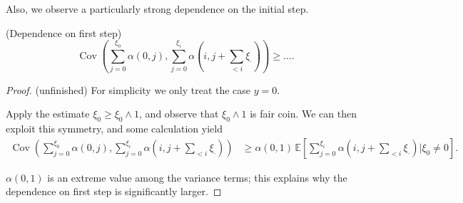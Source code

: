 Also, we observe a particularly strong dependence on the initial step.

\begin{lemma}(Dependence on first step)
	\[
		\operatorname{Cov} \left( \sum_{j = 0}^{\xi_0} \alpha(0, j), \sum_{j = 0}^{\xi_i} \alpha(i, j + \sum_{<i}\xi_\cdot ) \right)  
		\ge \ldots
.\] 
\end{lemma}
\begin{proof}
	(unfinished)
	For simplicity we only treat the case $y = 0$.

	Apply the estimate $\xi_0 \ge \xi_0 \wedge 1$, and observe that $\xi_0 \wedge 1$ is fair coin. We can then exploit this symmetry, and some calculation yield
	\begin{align*}
		\operatorname{Cov} \left( \sum_{j = 0}^{\xi_0} \alpha(0, j), \sum_{j = 0}^{\xi_i} \alpha(i, j + \sum_{<i}\xi_\cdot ) \right)  
		&\ge \alpha(0,1) \, \mathbb{E}\left[   \sum_{j = 0}^{\xi_i} \alpha(i, j + \sum_{<i}\xi_\cdot )  \bigg| \xi_0 \neq 0\right] 
	.\end{align*} 

	$\alpha(0,1)$ is an extreme value among the variance terms; this explains why the dependence on first step is significantly larger.

\end{proof}


